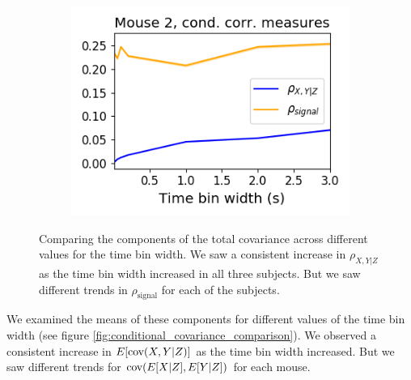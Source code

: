 \begin{figure}[h]
\begin{subfigure}[h]{0.5\linewidth}
      \includegraphics[width=\linewidth]{figures/eight_probe/Robbins_cond_corr_comparison.png}
      \label{fig:Robbins_cond_corr_comparison}
    \end{subfigure}
    \caption{Comparing the components of the total covariance across different values for the time bin width. We saw a consistent increase in $\rho_{X,Y|Z}$ as the time bin width increased in all three subjects. But we saw different trends in $\rho_{\text{signal}}$ for each of the subjects.}
    \label{fig:conditional_correlation_comparison}
  \end{figure}

  We examined the means of these components for different values of the time bin width (see figure \ref{fig:conditional_covariance_comparison}). We observed a consistent increase in $E[\text{cov} (X,Y|Z)]$ as the time bin width increased. But we saw different trends for $\text{cov} (E[X|Z], E[Y|Z])$ for each mouse.


